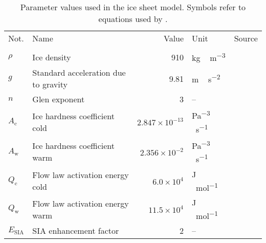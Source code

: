 \documentclass[tc, manuscript]{copernicus}
\begin{document}
    \begin{table*}[p]
      \caption{%
        Parameter values used in the ice sheet model. Symbols refer to
        equations used by \citet{Seguinot.2014, Seguinot.etal.2016}.}
      \label{tab:params}
      \scalebox{0.75}
      {\begin{tabular}{llrll}
        \tophline

        Not.    & Name & Value & Unit & Source \\

        \middlehline
        \multicolumn{2}{l}{{Ice rheology}} \\
        \middlehline

        $\rho$  & Ice density
                & 910
                & \unit{kg\,m^{-3}}
                & \citet{Aschwanden.etal.2012} \\

        $g$     & Standard acceleration due to gravity
                & 9.81
                & \unit{m\,s^{-2}}
                & \citet{Aschwanden.etal.2012} \\

        $n$     & Glen exponent
                & 3
                & --
                & \citet[p.~55--57]{Cuffey.Paterson.2010} \\

        $A_{\mathrm{c}}$   & Ice hardness coefficient cold
                & $2.847 \times 10^{-13}$
                & \unit{Pa^{-3}\,s^{-1}}
                & \citet[p.~72]{Cuffey.Paterson.2010} \\

        $A_{\mathrm{w}}$   & Ice hardness coefficient warm
                & $2.356 \times 10^{-2}$
                & \unit{Pa^{-3}\,s^{-1}}
                & \citet[p.~72]{Cuffey.Paterson.2010} \\

        $Q_{\mathrm{c}}$   & Flow law activation energy cold
                & $6.0 \times 10^4$
                & \unit{J\,mol^{-1}}
                & \citet[p.~72]{Cuffey.Paterson.2010} \\

        $Q_{\mathrm{w}}$   & Flow law activation energy warm
                & $11.5 \times 10^4$
                & \unit{J\,mol^{-1}}
                & \citet[p.~72]{Cuffey.Paterson.2010} \\

        $E_{\text{SIA}}$   & SIA enhancement factor
                & 2
                & --
                & \citet[p.~77]{Cuffey.Paterson.2010} \\


\end{tabular}}
\end{table*}
\end{document}
